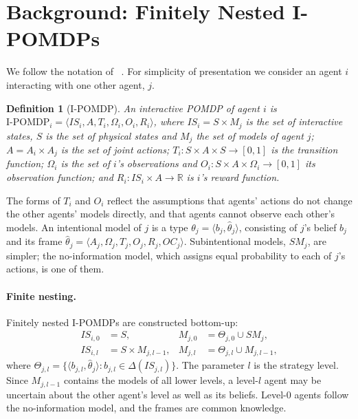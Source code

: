 \documentclass{article}
\newtheorem{definition}{Definition}
\newcommand{\IS}{\mathit{IS}}
\newcommand{\hth}{\hat{\theta}}
\newcommand{\citet}[1]{\citeauthor{#1}~\shortcite{#1}}
\begin{document}
\section{Background: Finitely Nested I-POMDPs}
\label{sec:background}

We follow the notation of \citet{gmytrasiewicz2005framework}. For simplicity of presentation we consider an agent $i$ interacting with one other agent, $j$.

\begin{definition}[I-POMDP]
An interactive POMDP of agent $i$ is $\text{I-POMDP}_i = \langle \IS_i, A, T_i, \Omega_i, O_i, R_i \rangle$, where $\IS_i = S \times M_j$ is the set of interactive states, $S$ is the set of physical states and $M_j$ the set of models of agent $j$; $A = A_i \times A_j$ is the set of joint actions; $T_i : S \times A \times S \to [0,1]$ is the transition function; $\Omega_i$ is the set of $i$'s observations and $O_i : S \times A \times \Omega_i \to [0,1]$ its observation function; and $R_i : \IS_i \times A \to \mathbb{R}$ is $i$'s reward function.
\end{definition}

The forms of $T_i$ and $O_i$ reflect the assumptions that agents' actions do not change the other agents' models directly, and that agents cannot observe each other's models. An intentional model of $j$ is a type $\theta_j = \langle b_j, \hth_j \rangle$, consisting of $j$'s belief $b_j$ and its frame $\hth_j = \langle A_j, \Omega_j, T_j, O_j, R_j, OC_j \rangle$. Subintentional models, $SM_j$, are simpler; the no-information model, which assigns equal probability to each of $j$'s actions, is one of them.

\paragraph{Finite nesting.} Finitely nested I-POMDPs are constructed bottom-up:
\begin{align*}
\IS_{i,0} &= S, & M_{j,0} &= \Theta_{j,0} \cup SM_j,\\
\IS_{i,l} &= S \times M_{j,l-1}, & M_{j,l} &= \Theta_{j,l} \cup M_{j,l-1},
\end{align*}
where $\Theta_{j,l} = \{\langle b_{j,l}, \hth_j \rangle : b_{j,l} \in \Delta(\IS_{j,l})\}$. The parameter $l$ is the strategy level. Since $M_{j,l-1}$ contains the models of all lower levels, a level-$l$ agent may be uncertain about the other agent's level as well as its beliefs. Level-0 agents follow the no-information model, and the frames are common knowledge.
\end{document}
